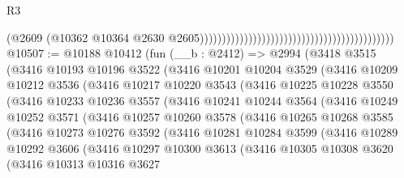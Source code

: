 \begin{lexlean}{R3}
\begin{coremodule}
                                                                                        (@2609
                                                                                          (@10362
                                                                                            @10364
                                                                                            @2630
                                                                                            @2605))))))))))))))))))))))))))))))))))))))))))))
@10507 := @10188
    @10412
    (fun (__b : @2412) =>
    @2994
      (@3418
        @3515
        (@3416
          @10193
          @10196
          @3522
          (@3416
            @10201
            @10204
            @3529
            (@3416
              @10209
              @10212
              @3536
              (@3416
                @10217
                @10220
                @3543
                (@3416
                  @10225
                  @10228
                  @3550
                  (@3416
                    @10233
                    @10236
                    @3557
                    (@3416
                      @10241
                      @10244
                      @3564
                      (@3416
                        @10249
                        @10252
                        @3571
                        (@3416
                          @10257
                          @10260
                          @3578
                          (@3416
                            @10265
                            @10268
                            @3585
                            (@3416
                              @10273
                              @10276
                              @3592
                              (@3416
                                @10281
                                @10284
                                @3599
                                (@3416
                                  @10289
                                  @10292
                                  @3606
                                  (@3416
                                    @10297
                                    @10300
                                    @3613
                                    (@3416
                                      @10305
                                      @10308
                                      @3620
                                      (@3416
                                        @10313
                                        @10316
                                        @3627

\end{coremodule}
\end{lexlean}

